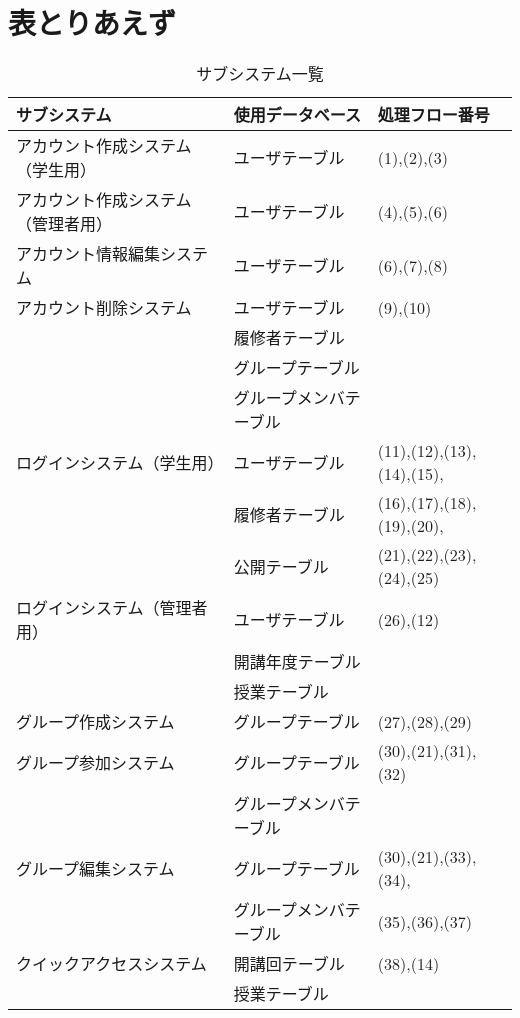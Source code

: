 \section{表とりあえず}
\begin{table}[H]
		\centering
		\caption{サブシステム一覧}
		\label{サブシステム一覧}
		\begin{tabular}{|l|l|l|}
		\hline
		サブシステム & 使用データベース  & 処理フロー番号\\ \hline\hline
		アカウント作成システム（学生用） & ユーザテーブル & (1),(2),(3)\\ \hline
		アカウント作成システム（管理者用） & ユーザテーブル & (4),(5),(6)\\ \hline
		アカウント情報編集システム & ユーザテーブル & (6),(7),(8)\\ \hline
		アカウント削除システム & ユーザテーブル & (9),(10)\\ \cline{2-2}
                        & 履修者テーブル & \\ \cline{2-2}
                        & グループテーブル & \\ \cline{2-2}
                        & グループメンバテーブル & \\ \hline
		ログインシステム（学生用） & ユーザテーブル & (11),(12),(13),(14),(15),\\ \cline{2-2}
		                        & 履修者テーブル & (16),(17),(18),(19),(20),\\ \cline{2-2}
                            & 公開テーブル & (21),(22),(23),(24),(25)\\ \hline
    ログインシステム（管理者用） & ユーザテーブル & (26),(12)\\ \cline{2-2}
		                        & 開講年度テーブル & \\ \cline{2-2}
                            & 授業テーブル & \\ \hline
    グループ作成システム & グループテーブル & (27),(28),(29)\\ \hline
    グループ参加システム & グループテーブル & (30),(21),(31),(32)\\ \cline{2-2}
                      & グループメンバテーブル & \\ \hline
    グループ編集システム & グループテーブル & (30),(21),(33),(34),\\ \cline{2-2}
                      & グループメンバテーブル &(35),(36),(37) \\ \hline
    クイックアクセスシステム & 開講回テーブル & (38),(14)\\ \cline{2-2}
                        　& 授業テーブル & \\ \cline{2-2}

\end{tabular}
\end{table}
